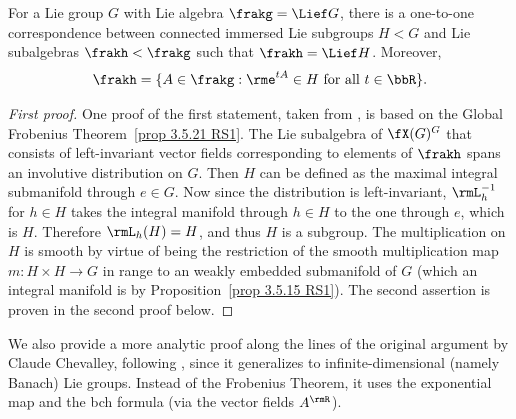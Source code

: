 \begin{thm}\label{thm analytic subgroup}
    For a Lie group $G$ with Lie algebra $\frakg=\Lief G$, there is a one-to-one correspondence between connected immersed Lie subgroups $H<G$ and Lie subalgebras $\frakh<\frakg$ such that $\frakh=\Lief H$. Moreover,
    \[\frakh=\{A\in\frakg: \rme^{tA}\in H\text{ for all }t\in\bbR\}.\]
\end{thm}
\begin{proof}[First proof]
    One proof of the first statement, taken from \cite[Prop.~5.6.5]{RS1}, is based on the Global Frobenius Theorem~\ref{prop 3.5.21 RS1}. The Lie subalgebra of $\fX(G)^G$ that consists of left-invariant vector fields corresponding to elements of $\frakh$ spans an involutive distribution on $G$. Then $H$ can be defined as the maximal integral submanifold through $e\in G$. Now since the distribution is left-invariant, $\rmL_h^{-1}$ for $h\in H$ takes the integral manifold through $h\in H$ to the one through $e$, which is $H$. Therefore $\rmL_h(H)=H$, and thus $H$ is a subgroup. The multiplication on $H$ is smooth by virtue of being the restriction of the smooth multiplication map $m:H\times H\to G$ in range to an weakly embedded submanifold of $G$ (which an integral manifold is by Proposition~\ref{prop 3.5.15 RS1}). The second assertion is proven in the second proof below.
\end{proof}
We also provide a more analytic proof along the lines of the original argument by Claude Chevalley, following \cite[Thm.~1.10.3]{DK}, since it generalizes to infinite-dimensional (namely Banach) Lie groups. Instead of the Frobenius Theorem, it uses the exponential map and the \gls{bch} formula (via the vector fields $A^\rmR$).
